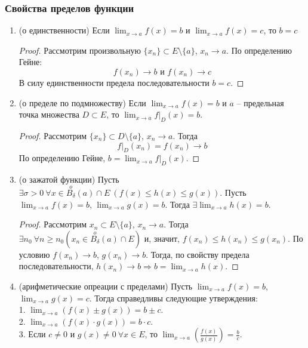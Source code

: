 \subsubsection{Свойства пределов функции}
\begin{enumerate}
    \item (о единственности) Если $\lim_{x \rightarrow a} f(x) = b$ и $\lim_{x \rightarrow a} f(x) = c$, то $b = c$
    \begin{proof}
        Рассмотрим произвольную $\{x_{n}\} \subset E \setminus \{a\}$, $x_{n} \rightarrow a$. По определению Гейне:
        \[f(x_{n}) \rightarrow b \text{ и } f(x_{n}) \rightarrow c\]
        В силу единственности предела последовательности $b = c$.
    \end{proof}
    \item (о пределе по подмножеству) Если $\lim_{x \rightarrow a} f(x) = b$ и $a$ -- предельная точка множества $D \subset E$, то $\lim_{x \rightarrow a} f|_{D}(x) = b$.
    \begin{proof}
        Рассмотрим $\{x_{n}\} \subset D \setminus \{a\}$, $x_{n} \rightarrow a$. Тогда
        \[f|_{D}(x_{n}) = f(x_{n}) \rightarrow b\]
        По определению Гейне, $b = \lim_{x \rightarrow a} f|_{D}(x)$.
    \end{proof}
    \item (о зажатой функции) Пусть $\exists \sigma > 0 \ \forall x \in \overset{o}{B_{\delta}} (a) \cap E \ (f(x) \leq h(x) \leq g(x))$. Пусть $\lim_{x \rightarrow a} f(x) = b$, $\lim_{x \rightarrow a} g(x) = b$. Тогда $\exists \lim_{x \rightarrow a} h(x) = b$.
    \begin{proof}
        Рассмотрим $x_{n} \subset E \setminus \{a\}$, $x_{n} \rightarrow a$. Тогда $\exists n_{0} \ \forall n \geq n_{0} (x_{n} \in \overset{o}{B_{\delta}}(a) \cap E)$ и, значит, $f(x_{n}) \leq h(x_{n}) \leq g(x_{n})$. По условию $f(x_{n}) \rightarrow b$, $g(x_{n}) \rightarrow b$. Тогда, по свойству предела последовательности, $h(x_{n}) \rightarrow b \Rightarrow b = \lim_{x \rightarrow a} h(x)$.
    \end{proof}
    \item (арифметические опреации с пределами) Пусть $\lim_{x \rightarrow a} f(x) = b$, $\lim_{x \rightarrow a} g(x) = c$. Тогда справедливы следующие утверждения:
    \\
    1. $\lim_{x \rightarrow a} (f(x) \pm g(x)) = b \pm c$.
    \\
    2. $\lim_{x \rightarrow a} (f(x) \cdot g(x)) = b \cdot c$.
    \\
    3. Если $c \neq 0$ и $g(x) \neq 0 \ \forall x \in E$, то $\lim_{x \rightarrow a} (\frac{f(x)}{g(x)}) = \frac{b}{c}$.
    

\end{enumerate}
